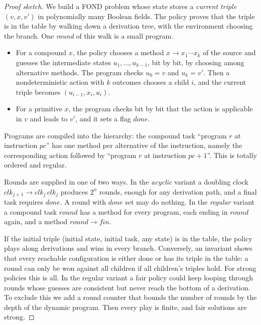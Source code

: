 \begin{proof}[Proof sketch]
  We build a FOND problem whose state stores a \emph{current triple} $(v,x,v')$ in polynomially many
  Boolean fields. The policy proves that the triple is in the table by walking down a derivation
  tree, with the environment choosing the branch. One \emph{round} of this walk is a small program.
  \begin{itemize}
    \item For a compound $x$, the policy chooses a method $x\to x_1\cdots x_k$ of the source and
      guesses the intermediate states $u_1,\dots,u_{k-1}$, bit by bit, by choosing among
      alternative methods. The program checks $u_0=v$ and $u_k=v'$. Then a nondeterministic action
      with $k$ outcomes chooses a child $i$, and the current triple becomes $(u_{i-1},x_i,u_i)$.
    \item For a primitive $x$, the program checks bit by bit that the action is applicable in $v$
      and leads to $v'$, and it sets a flag $\mathit{done}$.
  \end{itemize}
  Programs are compiled into the hierarchy: the compound task ``program $r$ at instruction $pc$''
  has one method per alternative of the instruction, namely the corresponding action followed by
  ``program $r$ at instruction $pc+1$''. This is totally ordered and regular.

  Rounds are supplied in one of two ways. In the \emph{acyclic} variant a doubling clock
  $\mathit{clk}_{j+1}\to\mathit{clk}_j\,\mathit{clk}_j$ produces $2^n$ rounds, enough for any
  derivation path, and a final task requires $\mathit{done}$. A round with $\mathit{done}$ set may
  do nothing. In the \emph{regular} variant a compound task $\mathit{round}$ has a method for every
  program, each ending in $\mathit{round}$ again, and a method $\mathit{round}\to\mathit{fin}$.

  If the initial triple (initial state, initial task, any state) is in the table, the policy plays
  along derivations and wins in every branch. Conversely, an invariant shows that every reachable
  configuration is either done or has its triple in the table: a round can only be won against all
  children if all children's triples hold. For strong policies this is all. In the regular variant
  a fair policy could keep looping through rounds whose guesses are consistent but never reach the
  bottom of a derivation. To exclude this we add a round counter that bounds the number of rounds by
  the depth of the dynamic program. Then every play is finite, and fair solutions are strong.
\end{proof}

